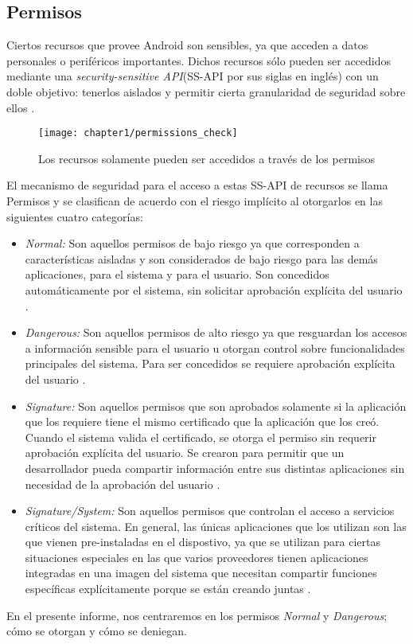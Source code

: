 \subsection{Permisos} \label{ch01-permisos}
Ciertos recursos que provee Android son sensibles, ya que acceden a datos personales o periféricos importantes. Dichos recursos sólo pueden ser accedidos mediante una \textit{security-sensitive API}(SS-API por sus siglas en inglés) con un doble objetivo: tenerlos aislados y permitir cierta granularidad de seguridad sobre ellos \cite{HYGZD2014}.\\
\begin{figure}[hbtp]
	\begin{center}
		\texttt{[image: chapter1/permissions\_check]}
		\caption{Los recursos solamente pueden ser accedidos a través de los permisos}
		\label{fig:ch01:permissions-check}
	\end{center}
\end{figure}
El mecanismo de seguridad para el acceso a estas SS-API de recursos se llama Permisos y se clasifican de acuerdo con el riesgo implícito al otorgarlos en las siguientes cuatro categorías:
\begin{itemize}
    \item \emph{Normal:} Son aquellos permisos de bajo riesgo ya que corresponden a características aisladas y son considerados de bajo riesgo para las demás aplicaciones, para el sistema y para el usuario. Son concedidos automáticamente por el sistema, sin solicitar aprobación explícita del usuario \cite{Rom14}.
    \item \emph{Dangerous:} Son aquellos permisos de alto riesgo ya que resguardan los accesos a información sensible para el usuario u otorgan control sobre funcionalidades principales del sistema. Para ser concedidos se requiere aprobación explícita del usuario \cite{Rom14}. 
    \item \emph{Signature:} Son aquellos permisos que son aprobados solamente si la aplicación que los requiere tiene el mismo certificado que la aplicación que los creó. Cuando el sistema valida el certificado, se otorga el permiso sin requerir aprobación explícita del usuario. Se crearon para permitir que un desarrollador pueda compartir información entre sus distintas aplicaciones sin necesidad de la aprobación del usuario \cite{Rom14}.
    \item \emph{Signature/System:} Son aquellos permisos que controlan el acceso a servicios críticos del sistema. En general, las únicas aplicaciones que los utilizan son las que vienen pre-instaladas en el dispostivo, ya que se utilizan para ciertas situaciones especiales en las que varios proveedores tienen aplicaciones integradas en una imagen del sistema que necesitan compartir funciones específicas explícitamente porque se están creando juntas \cite{Rom14}.
\end{itemize}
En el presente informe, nos centraremos en los permisos \emph{Normal} y \emph{Dangerous}; cómo se otorgan y cómo se deniegan.

